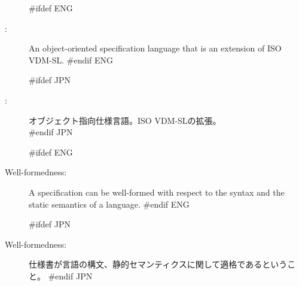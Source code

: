 \begin{description}
#ifdef ENG
\item[\vdmpp:] An object-oriented specification language
 that is an extension of ISO VDM-SL.
#endif ENG

#ifdef JPN
\item[\vdmpp:] オブジェクト指向仕様言語。ISO VDM-SLの拡張。\\
#endif JPN

#ifdef ENG
\item[Well-formedness:] A specification can be well-formed with
  respect to the syntax and the static semantics of a language.
#endif ENG

#ifdef JPN
\item[Well-formedness:] 仕様書が言語の構文、静的セマンティクスに関して適格であるということ。
#endif JPN

\end{description}
